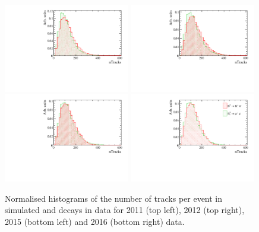 \begin{figure}[htbp]
  \centering
    \includegraphics[width=0.49\textwidth]{./Figs/LifetimeMeasurement/nTracks_2011_Bs2MuMu_Bd2KPi.pdf}
    \includegraphics[width=0.49\textwidth]{./Figs/LifetimeMeasurement/nTracks_2012_Bs2MuMu_Bd2KPi.pdf}
    \includegraphics[width=0.49\textwidth]{./Figs/LifetimeMeasurement/nTracks_2015_Bs2MuMu_Bd2KPi.pdf}
    \includegraphics[width=0.49\textwidth]{./Figs/LifetimeMeasurement/nTracks_2016_Bs2MuMu_Bd2KPi.pdf}
  \caption{Normalised histograms of the number of tracks per event in simulated \bdkpi and \bsmumu decays in data for 2011 (top left), 2012 (top right), 2015 (bottom left) and 2016 (bottom right) data. }
  \label{fig:BsmmVsBdToKpinTracks}
\end{figure}

